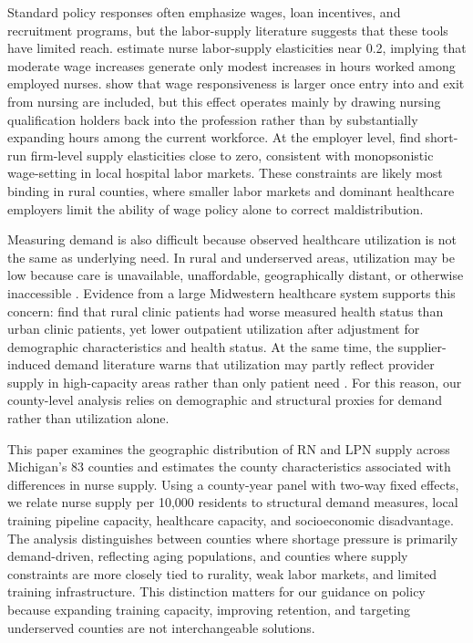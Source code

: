 \documentclass[12pt]{article}
\begin{document}
Standard policy responses often emphasize wages, loan incentives, and recruitment programs, but the labor-supply literature suggests that these tools have limited reach. \citet{askildsen2003} estimate nurse labor-supply elasticities near 0.2, implying that moderate wage increases generate only modest increases in hours worked among employed nurses. \citet{hanel2014} show that wage responsiveness is larger once entry into and exit from nursing are included, but this effect operates mainly by drawing nursing qualification holders back into the profession rather than by substantially expanding hours among the current workforce. At the employer level, \citet{staiger2010} find short-run firm-level supply elasticities close to zero, consistent with monopsonistic wage-setting in local hospital labor markets. These constraints are likely most binding in rural counties, where smaller labor markets and dominant healthcare employers limit the ability of wage policy alone to correct maldistribution.

Measuring demand is also difficult because observed healthcare utilization is not the same as underlying need. In rural and underserved areas, utilization may be low because care is unavailable, unaffordable, geographically distant, or otherwise inaccessible \citep{reilly2021}. Evidence from a large Midwestern healthcare system supports this concern: \citet{nuako2022} find that rural clinic patients had worse measured health status than urban clinic patients, yet lower outpatient utilization after adjustment for demographic characteristics and health status. At the same time, the supplier-induced demand literature warns that utilization may partly reflect provider supply in high-capacity areas rather than only patient need \citep{evans1974,grytten2001}. For this reason, our county-level analysis relies on demographic and structural proxies for demand rather than utilization alone.

This paper examines the geographic distribution of RN and LPN supply across Michigan's 83 counties and estimates the county characteristics associated with differences in nurse supply. Using a county-year panel with two-way fixed effects, we relate nurse supply per 10{,}000 residents to structural demand measures, local training pipeline capacity, healthcare capacity, and socioeconomic disadvantage. The analysis distinguishes between counties where shortage pressure is primarily demand-driven, reflecting aging populations, and counties where supply constraints are more closely tied to rurality, weak labor markets, and limited training infrastructure. This distinction matters for our guidance on policy because expanding training capacity, improving retention, and targeting underserved counties are not interchangeable solutions.
\end{document}
